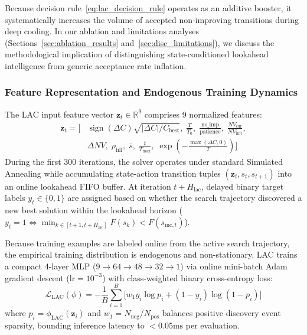 \documentclass{ieeeaccess}
\begin{document}
Because decision rule~\eqref{eq:lac_decision_rule} operates as an additive booster, it systematically increases the volume of accepted non-improving transitions during deep cooling. In our ablation and limitations analyses (Sections~\ref{sec:ablation_results} and~\ref{sec:disc_limitations}), we discuss the methodological implication of distinguishing state-conditioned lookahead intelligence from generic acceptance rate inflation.

\subsubsection{Feature Representation and Endogenous Training Dynamics}
The LAC input feature vector $\mathbf{z}_t \in \mathbb{R}^9$ comprises 9 normalized features:
\begin{align}
  \mathbf{z}_t = \Big[ 
    &\operatorname{sign}(\Delta C)\sqrt{|\Delta C| / C_{\text{best}}}, \;
    \frac{T}{T_0}, \;
    \frac{\text{no\_imp}}{\text{patience}}, \;
    \frac{NV_{\text{cur}}}{NV_{\text{init}}}, \nonumber \\
    &\Delta NV, \;
    \rho_{\text{fill}}, \;
    \bar{s}, \;
    \frac{t}{T_{\max}}, \;
    \exp\left(-\frac{\max(\Delta C, 0)}{T}\right)
  \Big]
  \label{eq:lac_features}
\end{align}
During the first 300 iterations, the solver operates under standard Simulated Annealing while accumulating state-action transition tuples $( \mathbf{z}_t, s_t, s_{t+1} )$ into an online lookahead FIFO buffer. At iteration $t + H_{\text{lac}}$, delayed binary target labels $y_t \in \{0, 1\}$ are assigned based on whether the search trajectory discovered a new best solution within the lookahead horizon ($y_t = 1 \iff \min_{k \in [t+1, t+H_{\text{lac}}]} F(s_k) < F(s_{\text{inc}, t})$).

Because training examples are labeled online from the active search trajectory, the empirical training distribution is endogenous and non-stationary. LAC trains a compact 4-layer MLP ($9 \to 64 \to 48 \to 32 \to 1$) via online mini-batch Adam gradient descent ($\text{lr} = 10^{-3}$) with class-weighted binary cross-entropy loss:
\begin{equation}
  \mathcal{L}_{\text{LAC}}(\phi) = -\frac{1}{B} \sum_{i=1}^B \Big[ w_1 y_i \log p_i + (1 - y_i) \log (1 - p_i) \Big]
  \label{eq:lac_loss}
\end{equation}
where $p_i = \phi_{\text{LAC}}(\mathbf{z}_i)$ and $w_1 = N_{\text{neg}} / N_{\text{pos}}$ balances positive discovery event sparsity, bounding inference latency to $< 0.05\text{ms}$ per evaluation.
\end{document}
